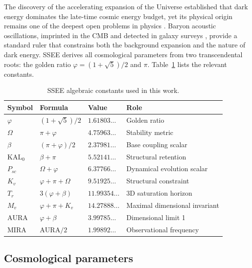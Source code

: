 \documentclass[12pt,a4paper]{article}
\begin{document}
The discovery of the accelerating expansion of the Universe
\citep{Riess1998,Perlmutter1999} established that dark energy dominates the
late-time cosmic energy budget, yet its physical origin remains one of the
deepest open problems in physics \citep{Weinberg1989}.
Baryon acoustic oscillations, imprinted in the CMB and detected in galaxy surveys
\citep{Eisenstein2005}, provide a standard ruler that constrains both the
background expansion and the nature of dark energy.
SSEE derives all cosmological parameters from two transcendental roots:
the golden ratio $\varphi=(1+\sqrt{5})/2$ and $\pi$.
Table~\ref{tab:constants} lists the relevant constants.

\begin{table}[ht]
\centering
\caption{SSEE algebraic constants used in this work.}
\label{tab:constants}
\begin{tabular}{llll}
\toprule
Symbol & Formula & Value & Role \\
\midrule
$\varphi$ & $(1+\sqrt{5})/2$ & $1.61803\ldots$ & Golden ratio \\
$\Omega$ & $\pi+\varphi$ & $4.75963\ldots$ & Stability metric \\
$\beta$   & $(\pi+\varphi)/2$ & $2.37981\ldots$ & Base coupling scalar \\
$\mathrm{KAL}_0$ & $\beta+\pi$ & $5.52141\ldots$ & Structural retention \\
$P_{sc}$  & $\Omega+\varphi$ & $6.37766\ldots$ & Dynamical evolution scalar \\
$K_v$     & $\varphi+\pi+\Omega$ & $9.51925\ldots$ & Structural constraint \\
$T_r$     & $3(\varphi+\beta)$ & $11.99354\ldots$ & 3D saturation horizon \\
$M_v$     & $\varphi+\pi+K_v$ & $14.27888\ldots$ & Maximal dimensional invariant \\
\midrule
$\mathrm{AURA}$ & $\varphi+\beta$ & $3.99785\ldots$ & Dimensional limit 1 \\
$\mathrm{MIRA}$ & $\mathrm{AURA}/2$ & $1.99892\ldots$ & Observational frequency \\
\bottomrule
\end{tabular}
\end{table}

\subsection{Cosmological parameters}
\end{document}

